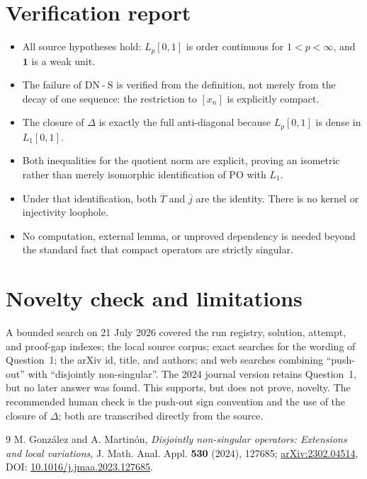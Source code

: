 \documentclass[11pt]{article}
\newcommand{\DNS}{\mathrm{DN\!\operatorname{-}S}}
\begin{document}
\section*{Verification report}

\begin{itemize}
\item All source hypotheses hold: $L_p[0,1]$ is order continuous for
$1<p<\infty$, and $\mathbf1$ is a weak unit.
\item The failure of $\DNS$ is verified from the definition, not merely from
the decay of one sequence: the restriction to $[x_n]$ is explicitly compact.
\item The closure of $\Delta$ is exactly the full anti-diagonal because
$L_p[0,1]$ is dense in $L_1[0,1]$.
\item Both inequalities for the quotient norm are explicit, proving an
isometric rather than merely isomorphic identification of $\mathrm{PO}$ with
$L_1$.
\item Under that identification, both $\overline T$ and $\overline j$ are the
identity. There is no kernel or injectivity loophole.
\item No computation, external lemma, or unproved dependency is needed beyond
the standard fact that compact operators are strictly singular.
\end{itemize}

\section*{Novelty check and limitations}

A bounded search on 21 July 2026 covered the run registry, solution, attempt,
and proof-gap indexes; the local source corpus; exact searches for the wording
of Question~1; the arXiv id, title, and authors; and web searches combining
``push-out'' with ``disjointly non-singular''. The 2024 journal version retains
Question~1, but no later answer was found. This supports, but does not prove,
novelty. The recommended human check is the push-out sign convention and the
use of the closure of $\Delta$; both are transcribed directly from the source.

\begin{thebibliography}{9}
M. González and A. Martinón,
\emph{Disjointly non-singular operators: Extensions and local variations},
J. Math. Anal. Appl. \textbf{530} (2024), 127685;
\href{https://arxiv.org/abs/2302.04514}{arXiv:2302.04514},
DOI: \href{https://doi.org/10.1016/j.jmaa.2023.127685}
{10.1016/j.jmaa.2023.127685}.
\end{thebibliography}
\end{document}
